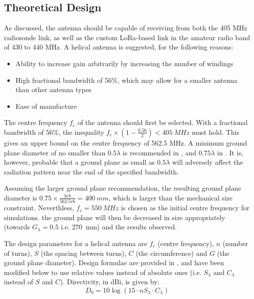 \subsection{Theoretical Design}
As discussed, the antenna should be capable of receiving from both the 405 MHz radiosonde link, as well as the custom LoRa-based link in the amateur radio band of 430 to 440 MHz. A helical antenna is suggested, for the following reasons:
\begin{itemize}
    \item Ability to increase gain arbitrarily by increasing the number of windings
    \item High fractional bandwidth of 56\%, which may allow for a smaller antenna than other antenna types
    \item Ease of manufacture
\end{itemize}

The centre frequency $f_c$ of the antenna should first be selected. With a fractional bandwidth of 56\%, the inequality $f_c \times (1 - \frac{0.56}{2}) < \SI{405}{MHz}$ must hold. This gives an upper bound on the centre frequency of 562.5 MHz. A minimum ground plane diameter of no smaller than $0.5 \lambda$ is recommended in \cite{textbook-antennaTheoryAnalysisDesign}, and $0.75 \lambda$ in \cite{textbook-helicalAntenna}. It is, however, probable that a ground plane as small as $0.5 \lambda$ will adversely affect the radiation pattern near the end of the specified bandwidth.

Assuming the larger ground plane recommendation, the resulting ground plane diameter is $0.75 \times \frac{3e8}{562.5e6} = \SI{400}{mm}$, which is larger than the mechanical size constraint. Neverthless, $f_c = \SI{550}{MHz}$ is chosen as the initial centre frequency for simulations. the ground plane will then be decreased in size appropriately (towards $G_\lambda = 0.5$ i.e. \SI{270}{mm}) and the results observed.

The design parameters for a helical antenna are $f_c$ (centre frequency), $n$ (number of turns), $S$ (the spacing between turns), $C$ (the circumference) and $G$ (the ground plane diameter). Design formulae are provided in \cite{textbook-antennaTheoryAnalysisDesign}, and have been modified below to use relative values instead of absolute ones (i.e. $S_\lambda$ and $C_\lambda$ instead of $S$ and $C$). Directivity, in dBi, is given by:
$$
D_0 = 10 \log(15 \cdot n S_\lambda \cdot C_\lambda)
$$

